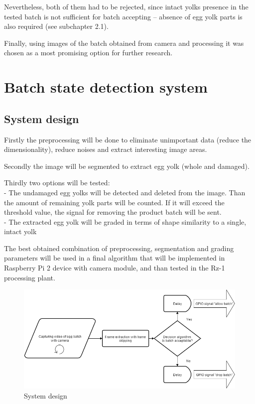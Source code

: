 \documentclass[12pt,twoside,a4paper]{article}
\begin{document}
Nevertheless, both of them had to be rejected, since intact yolks presence in the tested batch is not sufficient for batch accepting – absence of egg yolk parts is also required (see subchapter 2.1).

Finally, using images of the batch obtained from camera and processing it was chosen as a most promising option for further research.









\section{Batch state detection system}

\subsection{System design}


Firstly the preprocessing will be done to eliminate unimportant data (reduce the dimensionality), reduce noises and extract interesting image areas.

Secondly the image will be segmented to extract egg yolk (whole and damaged).

Thirdly two options will be tested:\\
- The undamaged egg yolks will be detected and deleted from the image. Than the amount of remaining yolk parts will be counted. If it will exceed the threshold value, the signal for removing the product batch will be sent.\\
- The extracted egg yolk will be graded in terms of shape similarity to a single, intact yolk

The best obtained combination of preprocessing, segmentation and grading parameters will be used in a final algorithm that will be implemented in Raspberry Pi 2 device with camera module, and than tested in the Rz-1 processing plant.

\begin{figure}[H]
\centering
\includegraphics[width=0.8\paperwidth]{system}
\caption{System design}
\end{figure}
\end{document}
